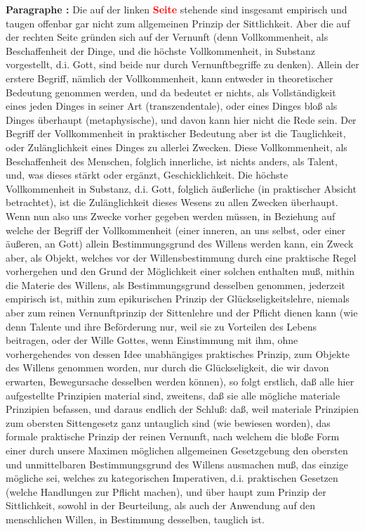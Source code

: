 \documentclass[a4paper,12pt,twoside]{book}
\newcommand{\match}[1]{\textcolor{red}{\textbf{#1}}}
\begin{document}
	\noindent\textbf{Paragraphe : }Die auf der linken \match{Seite} stehende sind insgesamt empirisch und taugen offenbar gar nicht zum allgemeinen Prinzip der Sittlichkeit. Aber die auf der rechten Seite gründen sich auf der Vernunft (denn Vollkommenheit, als Beschaffenheit der Dinge, und die höchste Vollkommenheit, in Substanz vorgestellt, d.i. Gott, sind beide nur durch Vernunftbegriffe zu denken). Allein der erstere Begriff, nämlich der Vollkommenheit, kann entweder in theoretischer Bedeutung genommen werden, und da bedeutet er nichts, als Vollständigkeit eines jeden Dinges in seiner Art (transzendentale), oder eines Dinges bloß als Dinges überhaupt (metaphysische), und davon kann hier nicht die Rede sein. Der Begriff der Vollkommenheit in praktischer Bedeutung aber ist die Tauglichkeit, oder Zulänglichkeit eines Dinges zu allerlei Zwecken. Diese Vollkommenheit, als Beschaffenheit des Menschen, folglich innerliche, ist nichts anders, als Talent, und, was dieses stärkt oder ergänzt, Geschicklichkeit. Die höchste Vollkommenheit in Substanz, d.i. Gott, folglich äußerliche (in praktischer Absicht betrachtet), ist die Zulänglichkeit dieses Wesens zu allen Zwecken überhaupt. Wenn nun also uns Zwecke vorher gegeben werden müssen, in Beziehung auf welche der Begriff der Vollkommenheit (einer inneren, an uns selbst, oder einer äußeren, an Gott) allein Bestimmungsgrund des Willens werden kann, ein Zweck aber, als Objekt, welches vor der Willensbestimmung durch eine praktische Regel vorhergehen und den Grund der Möglichkeit einer solchen enthalten muß, mithin die Materie des Willens, als Bestimmungsgrund desselben genommen, jederzeit empirisch ist, mithin zum epikurischen Prinzip der Glückseligkeitslehre, niemals aber zum reinen Vernunftprinzip der Sittenlehre und der Pflicht dienen kann (wie denn Talente und ihre Beförderung nur, weil sie zu Vorteilen des Lebens beitragen, oder der Wille Gottes, wenn Einstimmung mit ihm, ohne vorhergehendes von dessen Idee unabhängiges praktisches Prinzip, zum Objekte des Willens genommen worden, nur durch die Glückseligkeit, die wir davon erwarten, Bewegursache desselben werden können), so folgt erstlich, daß alle hier aufgestellte Prinzipien material sind, zweitens, daß sie alle mögliche materiale Prinzipien befassen, und daraus endlich der Schluß: daß, weil materiale Prinzipien zum obersten Sittengesetz ganz untauglich sind (wie bewiesen worden), das formale praktische Prinzip der reinen Vernunft, nach welchem die bloße Form einer durch  unsere Maximen möglichen allgemeinen Gesetzgebung den obersten und unmittelbaren Bestimmungsgrund des Willens ausmachen muß, das einzige mögliche sei, welches zu kategorischen Imperativen, d.i. praktischen Gesetzen (welche Handlungen zur Pflicht machen), und über haupt zum Prinzip der Sittlichkeit, sowohl in der Beurteilung, als auch der Anwendung auf den menschlichen Willen, in Bestimmung desselben, tauglich ist. 
	
\end{document}
